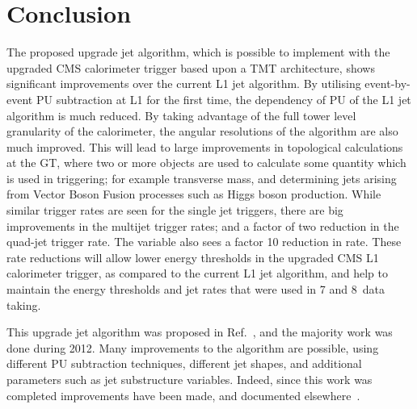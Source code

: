 \section{Conclusion}
The proposed upgrade jet algorithm, which is possible to implement with the upgraded \ac{CMS} calorimeter trigger based upon a \ac{TMT} architecture, shows significant improvements over the current \ac{L1} jet algorithm.
By utilising event-by-event \ac{PU} subtraction at \ac{L1} for the first time, the dependency of \ac{PU} of the \ac{L1} jet algorithm is much reduced.
By taking advantage of the full tower level granularity of the calorimeter, the angular resolutions of the algorithm are also much improved.
This will lead to large improvements in topological calculations at the \ac{GT}, where two or more objects are used to calculate some quantity which is used in triggering; for example transverse mass, and determining jets arising from Vector Boson Fusion processes such as Higgs boson production.
While similar trigger rates are seen for the single jet triggers, there are big improvements in the multijet trigger rates; and a factor of two reduction in the quad-jet trigger rate.
The \HT variable also sees a factor 10 reduction in rate.
These rate reductions will allow lower energy thresholds in the upgraded \ac{CMS} \ac{L1} calorimeter trigger, as compared to the current \ac{L1} jet algorithm, and help to maintain the energy thresholds and jet rates that were used in 7 and 8~\TeV data taking.


This upgrade jet algorithm was proposed in Ref.~\cite{Tapper:1556311}, and the majority work was done during 2012. 
Many improvements to the algorithm are possible, using different \ac{PU} subtraction techniques, different jet shapes, and additional parameters such as jet substructure variables.
Indeed, since this work was completed improvements have been made, and documented elsewhere~\cite{newL1jetWork}.

